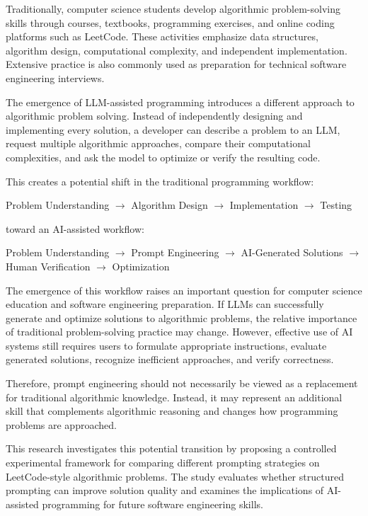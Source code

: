 \documentclass[11pt,a4paper]{article}
\begin{document}
Traditionally, computer science students develop algorithmic problem-solving
skills through courses, textbooks, programming exercises, and online coding
platforms such as LeetCode. These activities emphasize data structures,
algorithm design, computational complexity, and independent implementation.
Extensive practice is also commonly used as preparation for technical software
engineering interviews.

The emergence of LLM-assisted programming introduces a different approach to
algorithmic problem solving. Instead of independently designing and
implementing every solution, a developer can describe a problem to an LLM,
request multiple algorithmic approaches, compare their computational
complexities, and ask the model to optimize or verify the resulting code.

This creates a potential shift in the traditional programming workflow:

\begin{center}

Problem Understanding
$\rightarrow$
Algorithm Design
$\rightarrow$
Implementation
$\rightarrow$
Testing

\end{center}

toward an AI-assisted workflow:

\begin{center}

Problem Understanding
$\rightarrow$
Prompt Engineering
$\rightarrow$
AI-Generated Solutions
$\rightarrow$
Human Verification
$\rightarrow$
Optimization

\end{center}

The emergence of this workflow raises an important question for computer
science education and software engineering preparation. If LLMs can
successfully generate and optimize solutions to algorithmic problems, the
relative importance of traditional problem-solving practice may change.
However, effective use of AI systems still requires users to formulate
appropriate instructions, evaluate generated solutions, recognize inefficient
approaches, and verify correctness.

Therefore, prompt engineering should not necessarily be viewed as a replacement
for traditional algorithmic knowledge. Instead, it may represent an additional
skill that complements algorithmic reasoning and changes how programming
problems are approached.

This research investigates this potential transition by proposing a controlled
experimental framework for comparing different prompting strategies on
LeetCode-style algorithmic problems. The study evaluates whether structured
prompting can improve solution quality and examines the implications of
AI-assisted programming for future software engineering skills.
\end{document}
